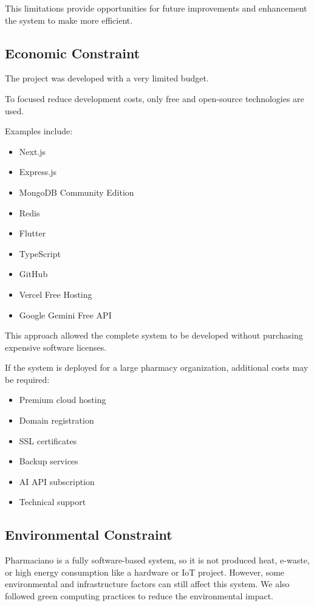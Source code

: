This limitations provide opportunities for future improvements and enhancement the system to make more efficient.

\subsection{Economic Constraint}
The project was developed with a very limited budget.

To focused reduce development costs, only free and open-source technologies are used.

Examples include:
\begin{itemize}
\item Next.js
\item Express.js
\item MongoDB Community Edition
\item Redis
\item Flutter
\item TypeScript
\item GitHub
\item Vercel Free Hosting
\item Google Gemini Free API
\end{itemize}
This approach allowed the complete system to be developed without purchasing expensive software licenses.

If the system is deployed for a large pharmacy organization, additional costs may be required:
\begin{itemize}
\item Premium cloud hosting
\item Domain registration
\item SSL certificates
\item Backup services
\item AI API subscription
\item Technical support
\end{itemize}

\subsection{Environmental Constraint}
Pharmaciano is a fully software-based system, so it is not produced heat, e-waste, or high energy consumption like a hardware or IoT project. However, some environmental and infrastructure factors can still affect this system. We also followed green computing practices to reduce the environmental impact.

